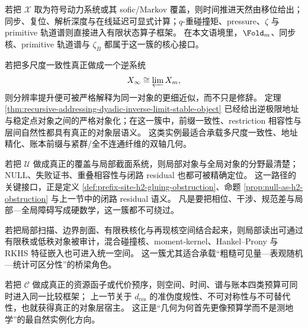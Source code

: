 \begin{remark}\label{rem:typed-address-biaxial-completion-cluster-symbolic}
若把 \(\mathcal X\) 取为符号动力系统或其 sofic/Markov 覆盖，则时间推进天然由移位给出；同步、复位、解析深度与在线延迟可显式计算；\(q\)-重碰撞矩、pressure、\(\zeta\) 与 primitive 轨道谱则直接进入有限状态算子框架。
在本文语境里，\(\Fold_m\)、同步核、primitive 轨道谱与 \(\zeta_B\) 都属于这一簇的核心接口。
\end{remark}

\begin{remark}\label{rem:typed-address-biaxial-completion-cluster-inverse-limit}
若把多尺度一致性真正做成一个逆系统
\[
X_\infty\cong \varprojlim X_m,
\]
则分辨率提升便可被严格解释为同一对象的更细近似，而不只是修辞。
定理 \ref{thm:recursive-addressing-dyadic-inverse-limit-stable-object} 已经给出逆极限地址与稳定点对象之间的严格对象化；在这一簇中，前缀一致性、restriction 相容性与层间自然性都具有真正的对象层语义。
这类实例最适合承载多尺度一致性、地址精化、账本前缀与紧群/全不连通纤维的双轴几何。
\end{remark}

\begin{remark}\label{rem:typed-address-biaxial-completion-cluster-cech}
若把 \(\mathcal U\) 做成真正的覆盖与局部截面系统，则局部对象与全局对象的分野最清楚；\(\mathrm{NULL}\)、失败证书、重叠相容性与闭路 residual 也都可被精确定位。
这一路径的关键接口，正是定义 \ref{def:prefix-site-h2-gluing-obstruction}、命题 \ref{prop:null-as-h2-obstruction} 与上一节中的闭路 residual 语义。
凡是要把相位、干涉、规范差与局部—全局障碍写成硬数学，这一簇都不可绕过。
\end{remark}

\begin{remark}\label{rem:typed-address-biaxial-completion-cluster-hilbert}
若把局部扫描、边界剖面、有限秩核化与再现核空间结合起来，则局部读出可通过有限秩或低秩对象被审计，混合碰撞核、moment-kernel、Hankel--Prony 与 RKHS 特征嵌入也可进入统一空间。
这一簇尤其适合承载“粗糙可见量—表观随机—统计可区分性”的桥梁角色。
\end{remark}

\begin{remark}\label{rem:typed-address-biaxial-completion-cluster-budget}
若把 \(\mathcal C\) 做成真正的资源函子或代价预序，则空间、时间、谱与账本四类预算可同时进入同一比较框架；
上一节关于 \(d_{\mathrm{res}}\) 的准伪度规性、不可对称性与不可替代性，也就获得真正的对象层宿主。
这正是“几何为何首先更像预算学而不是测地学”的最自然实例化方向。
\end{remark}


